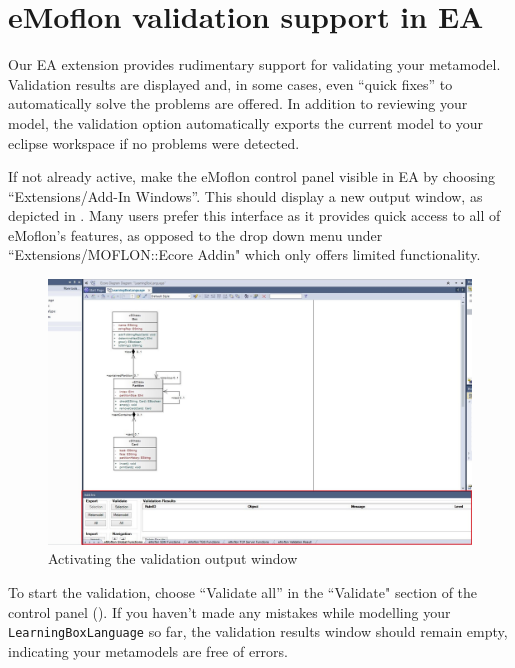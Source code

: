 \newpage
\genHeader
\hypertarget{validation vis}{} 
\section{eMoflon validation support in EA}
\label{sec:EAExport}

Our EA extension provides rudimentary support for validating your metamodel. Validation results are displayed and, in some cases, even ``quick fixes'' to
automatically solve the problems are offered. In addition to reviewing your model, the validation option automatically exports the current model to your eclipse
workspace if no problems were detected.

\begin{stepbystep}
\item If not already active, make the eMoflon control panel visible in EA by choosing ``Extensions/\-Add-In Windows''. This should
display a new output window, as depicted in .
Many users prefer this interface as it provides quick access to all of eMoflon's features, as opposed to the drop down menu under ``Extensions/MOFLON::Ecore Addin" which only offers limited functionality.

\begin{figure}[htbp]
	\centering
  \includegraphics[width=\textwidth]{../../org.moflon.doc.handbook.02_leitnersLearningBox/2_staticSemantics/5_validation/images/ea_controlPanel}
	\caption{Activating the validation output window}
	\label{ea:validation_output}
\end{figure}
\FloatBarrier

\clearpage
\item To start the validation, choose ``Validate all'' in the ``Validate" section of the control panel
(). If you haven't made any mistakes while modelling your \texttt{LearningBoxLanguage} so far, the validation results window
should remain empty, indicating your metamodels are free of errors.


\end{stepbystep}
